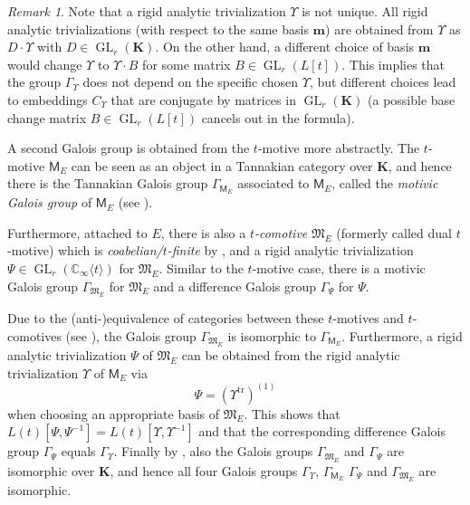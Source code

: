 \documentclass[10pt,a4paper]{amsart}
\theoremstyle{plain} %
\theoremstyle{definition}
\theoremstyle{remark}
\newtheorem{Remark}[Theorem]{Remark}
\newcommand{\CC}{\mathbb{C}}
\newcommand{\bK}{\mathbf{K}}
\newcommand{\bsm}{\boldsymbol{m}}
\newcommand{\tr}{\operatorname{tr}}
\newcommand{\GL}{\operatorname{GL}}
\newcommand{\KI}{\mathbb{K}_{\infty}}  %
\newcommand{\CI}{\CC_{\infty}}  %
\newcommand{\cs}[1]{\langle #1 \rangle} %
\newcommand{\mot}{\mathsf{M}}  %
\newcommand{\dmot}{\mathfrak{M}} %
\numberwithin{equation}{subsection}
\begin{document}
\begin{Remark}\label{rem:rats}
    Note that a rigid analytic trivialization $\Upsilon$ is not unique. All rigid analytic trivializations (with respect to the same basis $\bsm$) are obtained from $\Upsilon$ as $D\cdot \Upsilon$ with $D\in \GL_r(\bK)$. On the other hand, a different choice of basis $\bsm$ would change $\Upsilon$ to $\Upsilon\cdot  B$ for some matrix $B\in \GL_r(L[t])$.
 This implies that the group $\Gamma_\Upsilon$ does not depend on the specific chosen $\Upsilon$, but different choices lead to embeddings $C_\Upsilon$ that are conjugate by matrices in $\GL_r(\bK)$ (a possible base change matrix $B\in \GL_r(L[t])$ cancels out in the formula).
\end{Remark}

A second Galois group is obtained from the $t$-motive more abstractly. The $t$-motive $\mot_E$ can be seen as an object in a Tannakian category over $\bK$, and hence there is the Tannakian Galois group $\Gamma_{\mot_E}$ associated to $\mot_E$, called the \emph{motivic Galois group} of $\mot_E$ (see \cite[Definition 2.3.28]{uh-akj:pthshcff}).

Furthermore, attached to $E$, there is also a \emph{$t$-comotive} $\dmot_E$ (formerly called dual $t$-motive) which is \emph{coabelian/$t$-finite} by \cite[Theorem A]{am:aefam}, and a rigid analytic trivialization $\Psi\in \GL_r(\CI\cs{t})$ for $\dmot_E$.
Similar to the $t$-motive case, there is a motivic Galois group $\Gamma_{\dmot_E}$ for $\dmot_E$ and a difference Galois group $\Gamma_{\Psi}$ for $\Psi$.

Due to the (anti-)equivalence of categories between these $t$-motives and $t$-comotives (see \cite[Prop.~2.4.17]{uh-akj:pthshcff}), the Galois group $\Gamma_{\dmot_E}$ is isomorphic to 
$\Gamma_{\mot_E}$. Furthermore, a rigid analytic trivialization $\Psi$ of $\dmot_E$ can be obtained from the rigid analytic trivialization $\Upsilon$ of $\mot_E$ via
\begin{equation}\label{E:ratcomotive}
\Psi=(\Upsilon^{\tr})^{(1)} 
\end{equation}
when choosing an appropriate basis of $\dmot_E$.
This shows that $L(t)[\Psi,\Psi^{-1}]=L(t)[\Upsilon,\Upsilon^{-1}]$ and that the corresponding difference Galois group $\Gamma_{\Psi}$ equals $\Gamma_{\Upsilon}$. Finally by \cite[Theorem 4.5.10]{mp:tdadmaicl}, also the Galois groups $\Gamma_{\dmot_E}$ and $\Gamma_{\Psi}$ are isomorphic over $\bK$, and hence all four Galois groups $\Gamma_{\Upsilon}$, $\Gamma_{\mot_E}$ $\Gamma_{\Psi}$ and $\Gamma_{\dmot_E}$ are isomorphic.
\end{document}
